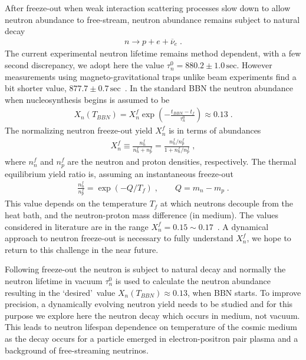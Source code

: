 After freeze-out when weak interaction scattering processes slow down to allow neutron abundance to free-stream, neutron abundance remains subject to natural decay
\begin{align}\label{Ndec}
n\longrightarrow p+e+\overline{\nu}_e\;.
\end{align}
The current experimental neutron lifetime remains method dependent, with a few second discrepancy, we adopt here the value $\tau_n^0=880.2\pm1.0\,\mathrm{sec}$. However measurements using magneto-gravitational traps unlike beam experiments find a bit shorter value, $877.7\pm0.7\,\mathrm{sec}$~\cite{Pattie:2017vsj}. In the standard BBN the neutron abundance when nucleosynthesis begins is assumed to be~\cite{Pitrou:2018cgg}
\begin{align}
\label{Xn_abundance}
X_n(T_{BBN})=X_n^f\exp\left(-\frac{t_{BBN}-t_f}{\tau_n^0}\right)\approx0.13\;.
\end{align}
The normalizing neutron freeze-out yield $X_n^f$ is in terms of abundances 
\begin{align}
\label{Xn_abundance2}
X_n^f \equiv \frac{n_n^f}{n_n^f+n_p^f}= \frac{n_n^f/n_p^f}{1+n_n^f/n_p^f}\;,
\end{align}
where $n_n^f$ and $n_p^f$ are the neutron and proton densities, respectively. The thermal equilibrium yield ratio is, assuming an instantaneous freeze-out
\begin{align}
\label{Xn_abundance3}
 \frac{n_n^f}{n_p^f}= \exp\left(-Q/T_f\right)\;,\qquad Q=m_n-m_p\;.
\end{align}
This value depends on the temperature $T_f$ at which neutrons decouple from the heat bath, and the neutron-proton mass difference (in medium). The values considered in literature are in the range $X_n^f=0.15\sim0.17$~\cite{Pitrou:2018cgg}. A dynamical approach to neutron freeze-out is necessary to fully understand $X_n^f$, we hope to return to this challenge in the near future.

Following freeze-out the neutron is subject to natural decay and normally the neutron lifetime in vacuum $\tau_n^0$ is used to calculate the neutron abundance resulting in the \lq desired\rq\ value $X_n(T_{BBN})\approx0.13$,  when BBN starts. To improve precision, a dynamically evolving neutron yield needs to be studied and for this purpose we explore here the neutron decay which occurs in medium, not vacuum. This leads to neutron lifespan dependence on temperature of the cosmic medium as the decay occurs for a particle emerged in electron-positron pair plasma and a background of free-streaming neutrinos.

